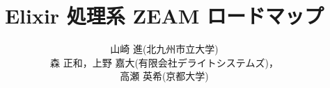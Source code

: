 \documentclass[11pt, uplatex]{jsarticle}
\begin{document}
\title{Elixir 処理系 ZEAM ロードマップ}

\author{山崎 進(北九州市立大学)\\森 正和，上野 嘉大(有限会社デライトシステムズ)，\\高瀬 英希(京都大学)}

\date{}

\maketitle






\end{document}
